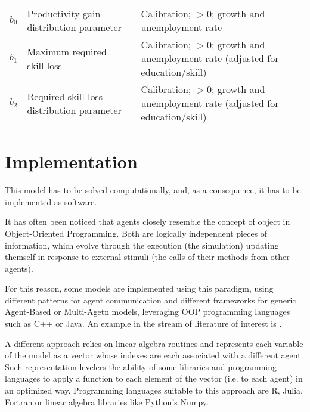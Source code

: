 \documentclass[a4paper, headings=standardclasses]{scrartcl}
\begin{document}
\begin{xltabular}{\linewidth}{lXlX}
    $b_0$                        & Productivity gain distribution parameter                     &       & Calibration; $>0$; growth and unemployment rate                                                                                                                                                               \\
    $b_1$                        & Maximum required skill loss                                  &       & Calibration; $>0$; growth and unemployment rate (adjusted for education/skill)                                                                                                                                                              \\
    $b_2$                        & Required skill loss distribution parameter                   &       &  Calibration; $>0$; growth and unemployment rate (adjusted for education/skill) \\
\end{xltabular}

\theendnotes

\section{Implementation}
This model has to be solved computationally, and, as a consequence, it has to be implemented as software.

It has often been noticed that agents closely resemble the concept of object in Object-Oriented Programming. Both are logically independent pieces of information, which evolve through the execution (the simulation) updating themself in response to external stimuli (the calls of their methods from other agents).

For this reason, some models are implemented using this paradigm, using different patterns for agent communication and different frameworks for generic Agent-Based or Multi-Agetn models, leveraging OOP programming languages such as C++ or Java. An example in the stream of literature of interest is \textcite{caiani2016}.

A different approach relies on linear algebra routines and represents each variable of the model as a vector whose indexes are each associated with a different agent. Such representation levelers the ability of some libraries and programming languages to apply a function to each element of the vector (i.e. to each agent) in an optimized way. Programming languages suitable to this approach are R, Julia, Fortran or linear algebra libraries like Python's Numpy.
\end{document}
